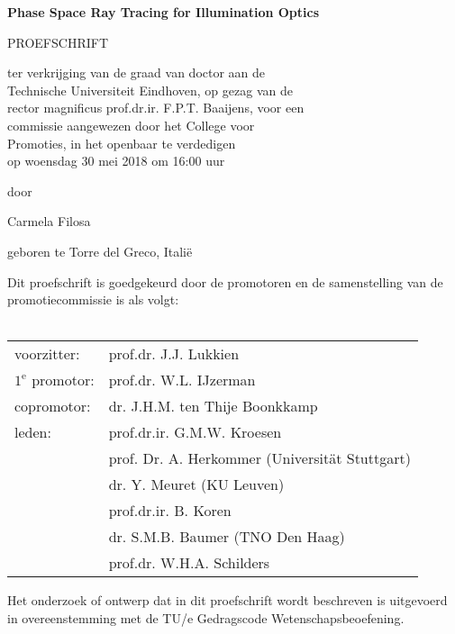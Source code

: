 \begin{center}
\begin{large}
\vspace*{3cm}
\textbf{Phase Space Ray Tracing for Illumination Optics}

\vspace*{2cm}

PROEFSCHRIFT

\vspace*{1.5cm}

ter verkrijging van de graad van doctor aan de \\ Technische Universiteit Eindhoven, op gezag van de \\ rector magnificus prof.dr.ir. F.P.T. Baaijens, voor een \\ commissie aangewezen door het College voor \\ Promoties, in het openbaar te verdedigen \\ op woensdag 30 mei 2018 om 16:00 uur






\vspace*{1.5cm}

door

\vspace*{1.5cm}

Carmela Filosa

\vspace*{1.5cm}

geboren te Torre del Greco, Itali\"e 

\end{large}
\end{center}

\clearpage
\thispagestyle{plain}
\begin{large}
\noindent Dit proefschrift is goedgekeurd door de promotoren en de samenstelling van de promotiecommissie is als volgt:\\
\vspace{0.4cm}\\
\begin{tabular}{ll}
voorzitter: & prof.dr. J.J. Lukkien \\
$1^{\text{e}}$ promotor: & prof.dr. W.L. IJzerman \\
copromotor: &  dr. J.H.M. ten Thije Boonkkamp \\
leden: & prof.dr.ir. G.M.W. Kroesen \\
& prof. Dr. A. Herkommer (Universität Stuttgart)\\
& dr. Y. Meuret (KU Leuven)\\
& prof.dr.ir. B. Koren\\
& dr. S.M.B. Baumer (TNO Den Haag)\\
& prof.dr. W.H.A. Schilders \\
\end{tabular}

\vspace*{10cm}
\noindent Het onderzoek of ontwerp dat in dit proefschrift  wordt beschreven is uitgevoerd in overeenstemming met de TU/e Gedragscode Wetenschapsbeoefening.
\end{large}
\clearpage

